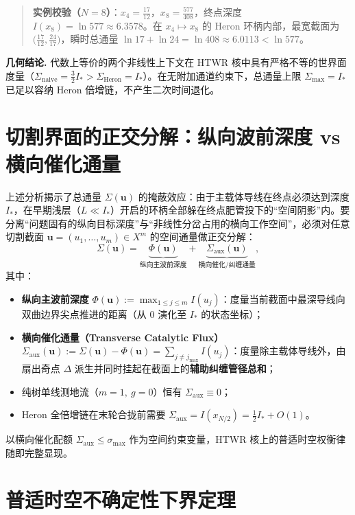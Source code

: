 \documentclass[11pt,a4paper]{ctexart}
\theoremstyle{plain}
\theoremstyle{definition}
\newcommand{\Saux}{\Sigma_{\mathrm{aux}}}
\begin{document}
\begin{quote}
\small
\textbf{实例校验（$N=8$）}：$x_4 = \frac{17}{12}$，$x_8 = \frac{577}{408}$，终点深度 $I(x_8) = \ln 577 \approx 6.3578$。在 $x_4 \mapsto x_8$ 的 Heron 环柄内部，最宽截面为 $\bigl(\frac{17}{12}, \frac{24}{17}\bigr)$，瞬时总通量 $\ln 17 + \ln 24 = \ln 408 \approx 6.0113 < \ln 577$。
\end{quote}

\textbf{几何结论.} 代数上等价的两个非线性上下文在 HTWR 核中具有严格不等的世界面度量（$\Sigma_{\mathrm{naive}} = \frac{3}{2}I_* > \Sigma_{\mathrm{Heron}} = I_*$）。在无附加通道约束下，总通量上限 $\Sigma_{\max} = I_*$ 已足以容纳 Heron 倍增链，不产生二次时间退化。

\section{切割界面的正交分解：纵向波前深度 vs 横向催化通量}

上述分析揭示了总通量 $\Sigma(\mathbf{u})$ 的掩蔽效应：由于主载体导线在终点必须达到深度 $I_*$，在早期浅层（$L \ll I_*$）开启的环柄全部躲在终点肥管投下的“空间阴影”内。要分离“问题固有的纵向目标深度”与“非线性分岔占用的横向工作空间”，必须对任意切割截面 $\mathbf{u} = (u_1, \dots, u_m) \in X^m$ 的空间通量做正交分解：
\[
\Sigma(\mathbf{u}) = \underbrace{\Phi(\mathbf{u})}_{\text{纵向主波前深度}} + \underbrace{\Saux(\mathbf{u})}_{\text{横向催化/纠缠通量}},
\]
其中：

\begin{itemize}
\item \textbf{纵向主波前深度} $\Phi(\mathbf{u}) := \max_{1 \le j \le m} I(u_j)$：度量当前截面中最深导线向双曲边界尖点推进的距离（从 $0$ 演化至 $I_*$ 的状态坐标）；
\item \textbf{横向催化通量（Transverse Catalytic Flux）} $\Saux(\mathbf{u}) := \Sigma(\mathbf{u}) - \Phi(\mathbf{u}) = \sum_{j \neq j_{\max}} I(u_j)$：度量除主载体导线外，由扇出奇点 $\Delta$ 派生并同时挂起在截面上的\textbf{辅助纠缠管径总和}；
\item 纯树单线测地流（$m=1,\ g=0$）恒有 $\Saux \equiv 0$；
\item Heron 全倍增链在末轮合拢前需要 $\Saux = I(x_{N/2}) = \frac{1}{2} I_* + O(1)$。
\end{itemize}

以横向催化配额 $\Saux \le \sigma_{\max}$ 作为空间约束变量，HTWR 核上的普适时空权衡律随即完整显现。

\section{普适时空不确定性下界定理}
\end{document}
